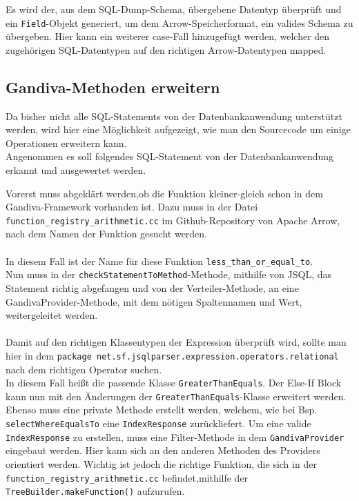Es wird der, aus dem SQL-Dump-Schema, übergebene Datentyp überprüft und ein \texttt{Field}-Objekt generiert, um dem Arrow-Speicherformat, ein valides Schema zu übergeben.
Hier kann ein weiterer case-Fall hinzugefügt werden, welcher den zugehörigen SQL-Datentypen auf den richtigen Arrow-Datentypen mapped.

\subsection{Gandiva-Methoden erweitern}

Da bisher nicht alle SQL-Statements von der Datenbankanwendung unterstützt werden, wird hier eine Möglichkeit aufgezeigt, wie man den Sourcecode um einige Operationen erweitern kann.\\
Angenommen es soll folgendes SQL-Statement von der Datenbankanwendung erkannt und ausgewertet werden.

\begin{center}
\end{center}

Vorerst muss abgeklärt werden,ob die Funktion \glqq{}kleiner-gleich\grqq{} schon in dem Gandiva-Framework vorhanden ist. Dazu muss in der Datei \texttt{function\_registry\_arithmetic.cc} im Github-Repository von Apache Arrow, nach dem Namen der Funktion gesucht werden.\cite{Github:Arrow:functionregistry} \\\\

In diesem Fall ist der Name für diese Funktion \texttt{less\_than\_or\_equal\_to}.\\
Nun muss in der \texttt{checkStatementToMethod}-Methode, mithilfe von JSQL, das Statement richtig abgefangen und von der Verteiler-Methode, an eine GandivaProvider-Methode, mit dem nötigen Spaltennamen und Wert, weitergeleitet werden.\\\\

Damit auf den richtigen Klassentypen der Expression überprüft wird, sollte man hier in dem \texttt{package net.sf.jsqlparser.expression.operators.relational} nach dem richtigen Operator suchen.\\
In diesem Fall heißt die passende Klasse \texttt{GreaterThanEquals}. Der Else-If Block kann nun mit den Änderungen der \texttt{GreaterThanEquals}-Klasse erweitert werden. Ebenso muss eine private Methode erstellt werden, welchem, wie bei Bsp. \texttt{selectWhereEqualsTo} eine \texttt{IndexResponse} zurückliefert.
Um eine valide \texttt{IndexResponse} zu erstellen, muss eine Filter-Methode in dem \texttt{GandivaProvider} eingebaut werden.
Hier kann sich an den anderen Methoden des Providers orientiert werden. Wichtig ist jedoch die richtige Funktion, die sich in der \texttt{function\_registry\_arithmetic.cc} befindet,mithilfe der \texttt{TreeBuilder.makeFunction()} aufzurufen.


